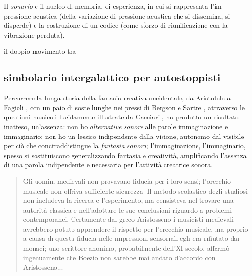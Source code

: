 
Il \emph{sonario} è il nucleo di memoria, di esperienza, in cui si rappresenta
l'im-pressione acustica (della variazione di pressione acustica che si dissemina,
si disperde) e la costruzione di un codice (come sforzo di riunificazione con
la vibrazione perduta).

\begin{figure}[htbp]
\begin{center}
\caption{}
\label{sonario}
\end{center}
\end{figure}



 il doppio movimento tra
\subsection{simbolario intergalattico per autostoppisti}

Percorrere la lunga storia della fantasia creativa occidentale, da Aristotele a
Fagioli \cite{mf:istinto}, con un paio di soste lunghe nei pressi di
Bergson \cite{bergson1896} e Sartre \cite{jps:immaginario}, attraverso le questioni
musicali lucidamente illustrate da Cacciari \cite{Cacciari1995}, ha prodotto un
risultato inatteso, un'assenza: non ho \emph{alternative sonore} alle parole
immaginazione e immaginario; non ho un lessico indipendente dalla visione,
autonomo dal visibile per ciò che conctraddistingue la \emph{fantasia sonora};
l'immaginazione, l'immaginario, spesso si sostituiscono generalizzando fantasia
e creatività, amplificando l'assenza di una parola indipendente e necessaria per
l'attività creatrice sonora.

\begin{quote}
\begin{sf}
\small
Gli uomini medievali non provavano fiducia per i loro sensi; l'orecchio musicale
non offriva sufficiente sicurezza. Il metodo scolastico degli studiosi non
includeva la ricerca e l'esperimento, ma consisteva nel trovare una autorità
classica e nell'adottare le sue conclusioni riguardo a problemi contemporanei.
Certamente dal greco Aristosseno i musicisti medievali avrebbero potuto
apprendere il rispetto per l'orecchio musicale, ma proprio a causa di questa
fiducia nelle impressioni sensoriali egli era rifiutato dai monaci; uno
scrittore anonimo, probabilmente dell'XI secolo, affermò ingenuamente che Boezio
non sarebbe mai andato d'accordo con Aristosseno... \cite{sachs1996}
\end{sf}
\end{quote}

